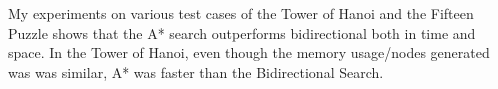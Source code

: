 \documentclass[conference]{IEEEtran}
\begin{document}
My experiments on various test cases of the Tower of Hanoi and the Fifteen Puzzle shows that the A* search outperforms bidirectional both in time and space. In the Tower of Hanoi, even though the memory usage/nodes generated was was similar, A* was faster than the Bidirectional Search.





%
%




%
%
\end{document}
